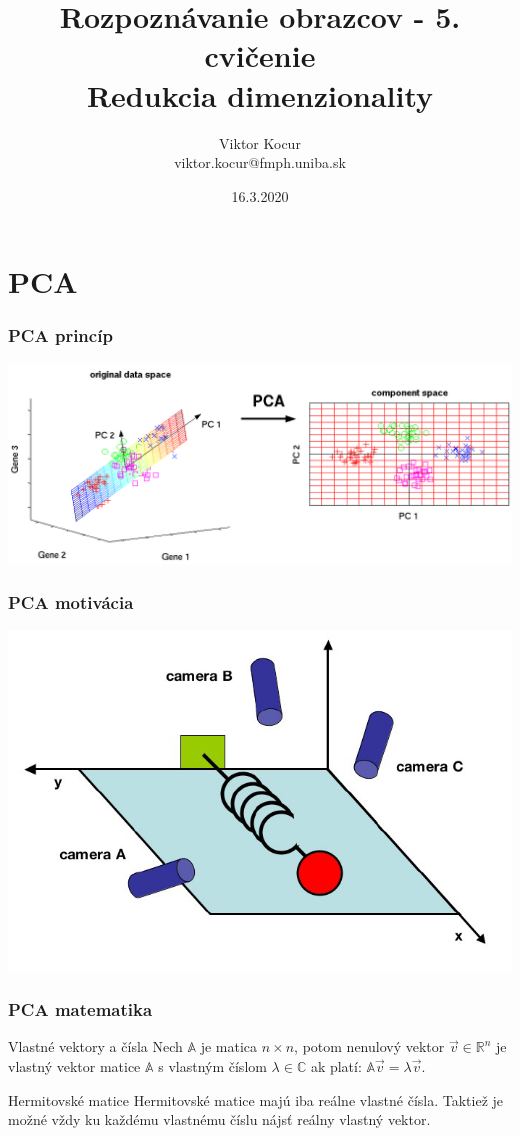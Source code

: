 \documentclass{beamer}
\title[PCA a LDA]{Rozpoznávanie obrazcov - 5. cvičenie \\ Redukcia dimenzionality}
\author[Viktor Kocur]{Viktor Kocur \\{\small viktor.kocur@fmph.uniba.sk}}
\institute{DAI FMFI UK}
\date{16.3.2020}
\begin{document}

\begin{frame}[plain]
  \titlepage  
\end{frame}

\section{PCA}

\begin{frame}
\frametitle{PCA princíp}
\includegraphics[width=\textwidth]{PCA.png}
\end{frame}


\begin{frame}
\frametitle{PCA motivácia}
\includegraphics[width=\textwidth]{PCAcameras.png}
\end{frame}


\begin{frame}
\frametitle{PCA matematika}

\begin{block}{Vlastné vektory a čísla}
Nech $\mathbb{A}$ je matica $n \times n$, potom nenulový vektor $\vec{v} \in \mathbb{R}^n$ je vlastný vektor matice $\mathbb{A}$ s vlastným číslom $\lambda \in \mathbb{C}$ ak platí: $\mathbb{A}\vec{v} = \lambda \vec{v}$. 
\end{block}

\begin{block}{Hermitovské matice}
Hermitovské matice majú iba reálne vlastné čísla. Taktiež je možné vždy ku každému vlastnému číslu nájsť reálny vlastný vektor.
\end{block}
\end{frame}
\end{document}
